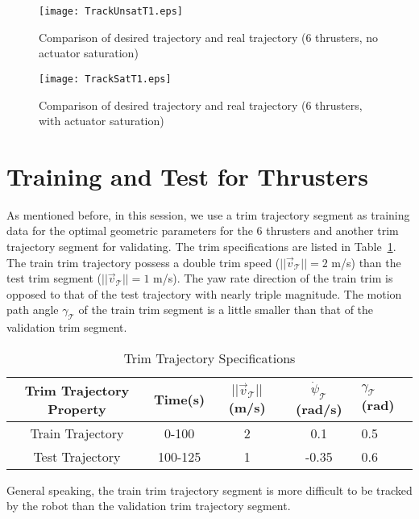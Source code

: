 \begin{figure}
\texttt{[image: TrackUnsatT1.eps]}
\caption{Comparison of desired trajectory and real trajectory (6 thrusters, no actuator saturation)}	
\label{FIG:TrackUnsatT1}
\end{figure}
\begin{figure}
\texttt{[image: TrackSatT1.eps]}
\caption{Comparison of desired trajectory and real trajectory (6 thrusters, with actuator saturation)}	
\label{FIG:TrackSatT1}
\end{figure}

\section{Training and Test for Thrusters}
As mentioned before, in this session,  we use a trim trajectory segment as training data for the optimal geometric parameters for the 6 thrusters and another trim trajectory segment for validating. The trim specifications are listed in Table~\ref{table:TrimValuesTrainTest}. The train trim trajectory possess a double trim speed ($||\vec{v}_{\mathcal{T}}||=2$ m/s) than the test trim segment ($||\vec{v}_{\mathcal{T}}||=1$ m/s). The yaw rate direction of the train trim is opposed to that of the test trajectory with nearly triple magnitude. The motion path angle $\gamma_{\mathcal{T}}$ of the train trim segment is a little smaller than that of the validation trim segment.

\begin{table}[h]
\centering
\caption{Trim Trajectory Specifications}
\begin{tabular}{| c | c | c | c | p{2cm} |}
\hline
Trim Trajectory Property&Time(s)&$||\vec{v}_{\mathcal{T}}||$ (m/s)&$\dot{\psi}_{\mathcal{T}}$ (rad/s)&$\gamma_{\mathcal{T}}$ (rad)\\ \hline
Train Trajectory&0-100&2&0.1&0.5\\ \hline
Test Trajectory&100-125&1&-0.35&0.6 \\ \hline
\end{tabular}
\label{table:TrimValuesTrainTest}
\end{table} 

General speaking, the train trim trajectory segment is more difficult to be tracked by the robot than the validation trim trajectory segment.     
 
